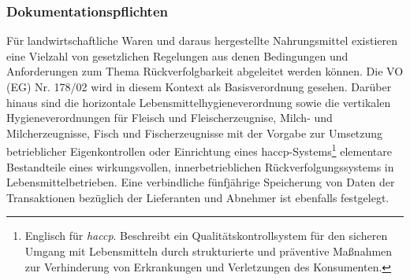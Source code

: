 
\subsubsection{Dokumentationspflichten}
Für landwirtschaftliche Waren und daraus hergestellte Nahrungsmittel existieren eine Vielzahl von gesetzlichen Regelungen aus denen Bedingungen und Anforderungen zum Thema Rückverfolgbarkeit abgeleitet werden können. Die VO (EG) Nr. 178/02 \citep{EPER2002} wird in diesem Kontext als Basisverordnung gesehen. Darüber hinaus sind die horizontale Lebensmittelhygieneverordnung sowie die vertikalen Hygieneverordnungen für Fleisch und Fleischerzeugnise, Milch- und Milcherzeugnisse, Fisch und Fischerzeugnisse mit der Vorgabe zur Umsetzung betrieblicher Eigenkontrollen oder Einrichtung eines \acs{haccp}-Systems\footnote{Englisch für \textit{\acf{haccp}}. Beschreibt ein Qualitätskontrollsystem für den sicheren Umgang mit Lebensmitteln durch strukturierte und präventive Maßnahmen zur Verhinderung von Erkrankungen und Verletzungen des Konsumenten.\citep{EPER2004}} elementare Bestandteile eines wirkungsvollen, innerbetrieblichen Rückverfolgungssystems in Lebensmittelbetrieben. Eine verbindliche fünfjährige Speicherung von Daten der Transaktionen bezüglich der Lieferanten und Abnehmer ist ebenfalls festgelegt.\\

